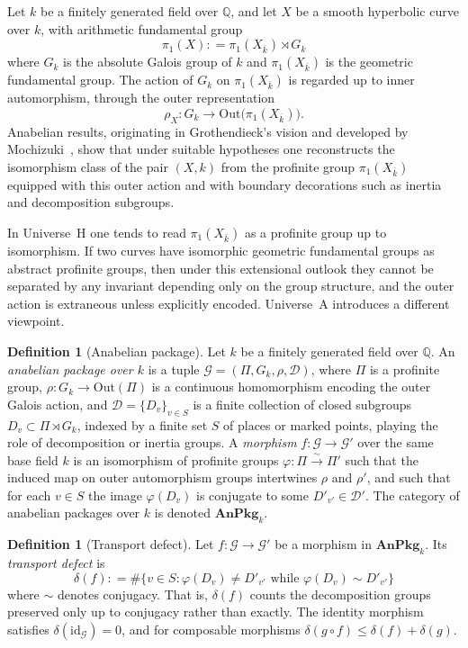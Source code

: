 \documentclass[10pt, reqno]{amsart}
\theoremstyle{plain}
\theoremstyle{definition}
\newtheorem{definition}[theorem]{Definition}
\theoremstyle{plain}
\newcommand{\Q}{\mathbb{Q}}
\newcommand{\coloneqq}{\mathrel{\mathop:}=}
\begin{document}
Let $k$ be a finitely generated field over $\Q$, and let $X$ be a smooth hyperbolic curve over $k$, with arithmetic fundamental group
\[
  \pi_1(X) \coloneqq \pi_1(X_{\overline{k}}) \rtimes G_k
\]
where $G_k$ is the absolute Galois group of $k$ and $\pi_1(X_{\overline{k}})$ is the geometric fundamental group. The action of $G_k$ on $\pi_1(X_{\overline{k}})$ is regarded up to inner automorphism, through the outer representation
\[
  \rho_X \colon G_k \longrightarrow \mathrm{Out}\bigl(\pi_1(X_{\overline{k}})\bigr).
\]
Anabelian results, originating in Grothendieck's vision and developed by Mochizuki~\cite{mochizuki1999local, MochizukiAbAnIII}, show that under suitable hypotheses one reconstructs the isomorphism class of the pair $(X,k)$ from the profinite group $\pi_1(X_{\overline{k}})$ equipped with this outer action and with boundary decorations such as inertia and decomposition subgroups.

In Universe~H one tends to read $\pi_1(X_{\overline{k}})$ as a profinite group up to isomorphism. If two curves have isomorphic geometric fundamental groups as abstract profinite groups, then under this extensional outlook they cannot be separated by any invariant depending only on the group structure, and the outer action is extraneous unless explicitly encoded. Universe~A introduces a different viewpoint.

\begin{definition}[Anabelian package]\label{def:AnabelianPackage}
Let $k$ be a finitely generated field over $\Q$. An \emph{anabelian package over $k$} is a tuple $\mathcal{G} = (\Pi, G_k, \rho, \mathcal{D})$, where $\Pi$ is a profinite group, $\rho \colon G_k \to \mathrm{Out}(\Pi)$ is a continuous homomorphism encoding the outer Galois action, and $\mathcal{D} = \{D_v\}_{v \in S}$ is a finite collection of closed subgroups $D_v \subset \Pi \rtimes G_k$, indexed by a finite set $S$ of places or marked points, playing the role of decomposition or inertia groups. A \emph{morphism} $f \colon \mathcal{G} \to \mathcal{G}'$ over the same base field $k$ is an isomorphism of profinite groups $\varphi \colon \Pi \xrightarrow{\sim} \Pi'$ such that the induced map on outer automorphism groups intertwines $\rho$ and $\rho'$, and such that for each $v \in S$ the image $\varphi(D_v)$ is conjugate to some $D'_{v'} \in \mathcal{D}'$. The category of anabelian packages over $k$ is denoted $\mathbf{AnPkg}_k$.
\end{definition}

\begin{definition}[Transport defect]\label{def:TransportDefect}
Let $f \colon \mathcal{G} \to \mathcal{G}'$ be a morphism in $\mathbf{AnPkg}_k$. Its \emph{transport defect} is
\[
  \delta(f) \coloneqq \#\bigl\{ v \in S : \varphi(D_v) \ne D'_{v'} \text{ while } \varphi(D_v) \sim D'_{v'} \bigr\}
\]
where $\sim$ denotes conjugacy. That is, $\delta(f)$ counts the decomposition groups preserved only up to conjugacy rather than exactly. The identity morphism satisfies $\delta(\mathrm{id}_{\mathcal{G}}) = 0$, and for composable morphisms $\delta(g \circ f) \le \delta(f) + \delta(g)$.
\end{definition}
\end{document}
